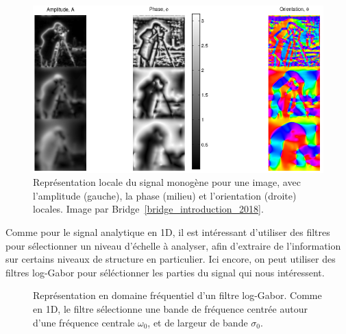 \begin{figure}
    \centering
    \includegraphics[width=\textwidth]{contenu/resources/images/local_information_monogenic}
    \caption[Représentation locale du signal monogène]{Représentation locale du signal monogène pour une image, avec l'amplitude (gauche), la phase (milieu) et l'orientation (droite) locales. Image par Bridge~\ref{bridge_introduction_2018}.}
    \label{fig:monogenic-local-representation}
\end{figure}

\bigskip

Comme pour le signal analytique en 1D, il est intéressant d'utiliser des filtres pour sélectionner un niveau d'échelle à analyser, afin d'extraire de l'information sur certains niveaux de structure en particulier. Ici encore, on peut utiliser des filtres log-Gabor pour séléctionner les parties du signal qui nous intéressent.

\begin{figure}
    \centering

    \caption[Filtre log-Gabor en 2D]{Représentation en domaine fréquentiel d'un filtre log-Gabor. Comme en 1D, le filtre sélectionne une bande de fréquence centrée autour d'une fréquence centrale $\omega_0$, et de largeur de bande $\sigma_0$.}
    \label{fig:2D-log-gabor}
\end{figure}

